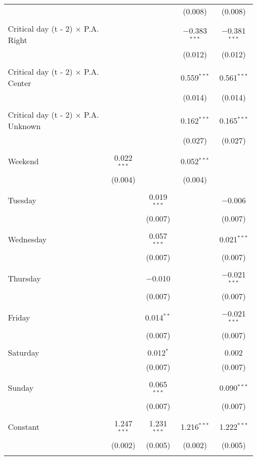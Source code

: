 \documentclass[
]{article}
\begin{document}
\begin{table}[!htbp]
{\begin{tabular}{@{\extracolsep{5pt}}lcccc}
  &  &  & (0.008) & (0.008) \\ 
  & & & & \\ 
 Critical day (t - 2) $\times$ P.A. Right &  &  & $-$0.383$^{***}$ & $-$0.381$^{***}$ \\ 
  &  &  & (0.012) & (0.012) \\ 
  & & & & \\ 
 Critical day (t - 2) $\times$ P.A. Center &  &  & 0.559$^{***}$ & 0.561$^{***}$ \\ 
  &  &  & (0.014) & (0.014) \\ 
  & & & & \\ 
 Critical day (t - 2) $\times$ P.A. Unknown &  &  & 0.162$^{***}$ & 0.165$^{***}$ \\ 
  &  &  & (0.027) & (0.027) \\ 
  & & & & \\ 
 Weekend & 0.022$^{***}$ &  & 0.052$^{***}$ &  \\ 
  & (0.004) &  & (0.004) &  \\ 
  & & & & \\ 
 Tuesday &  & 0.019$^{***}$ &  & $-$0.006 \\ 
  &  & (0.007) &  & (0.007) \\ 
  & & & & \\ 
 Wednesday &  & 0.057$^{***}$ &  & 0.021$^{***}$ \\ 
  &  & (0.007) &  & (0.007) \\ 
  & & & & \\ 
 Thursday &  & $-$0.010 &  & $-$0.021$^{***}$ \\ 
  &  & (0.007) &  & (0.007) \\ 
  & & & & \\ 
 Friday &  & 0.014$^{**}$ &  & $-$0.021$^{***}$ \\ 
  &  & (0.007) &  & (0.007) \\ 
  & & & & \\ 
 Saturday &  & 0.012$^{*}$ &  & 0.002 \\ 
  &  & (0.007) &  & (0.007) \\ 
  & & & & \\ 
 Sunday &  & 0.065$^{***}$ &  & 0.090$^{***}$ \\ 
  &  & (0.007) &  & (0.007) \\ 
  & & & & \\ 
 Constant & 1.247$^{***}$ & 1.231$^{***}$ & 1.216$^{***}$ & 1.222$^{***}$ \\ 
  & (0.002) & (0.005) & (0.002) & (0.005) \\ 
  & & & & \\ 

\end{tabular}}
\end{table}
\end{document}
